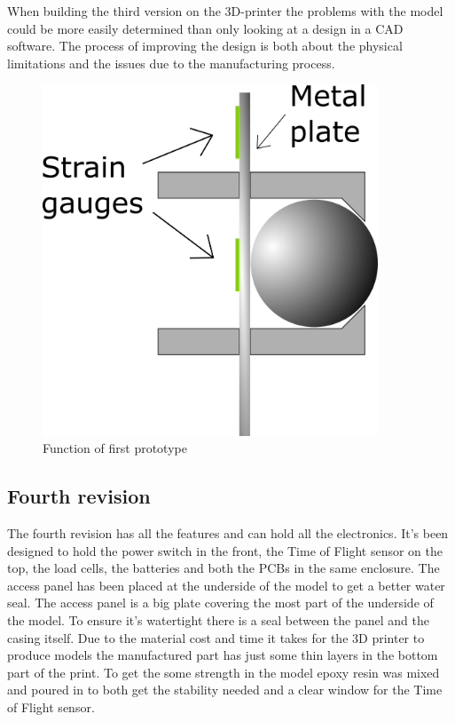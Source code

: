 When building the third version on the 3D-printer the problems with the model could be more easily determined than only looking at a design in a CAD software. The process of improving the design is both about the physical limitations and the issues  due to the manufacturing process. 

\begin{figure}[H]
\begin{center}
	\includegraphics[width = 10cm]{Figures/Press_sens_func_1.png}
	\caption{Function of first prototype}
	\label{Press_sens_prot_1}
\end{center}
\end{figure}

\subsection{Fourth revision}

The fourth revision has all the features and can hold all the electronics. It's been designed to hold the power switch in the front, the Time of Flight sensor on the top, the load cells, the batteries and both the PCBs in the same enclosure. The access panel has been placed at the underside of the model to get a better water seal. The access panel is a big plate covering the most part of the underside of the model. To ensure it's watertight there is a seal between the panel and the casing itself.
Due to the material cost and time it takes for the 3D printer to produce models the manufactured part has just some thin layers in the bottom part of the print. To get the some strength in the model epoxy resin was mixed and poured in to both get the stability needed and a clear window for the Time of Flight sensor.

